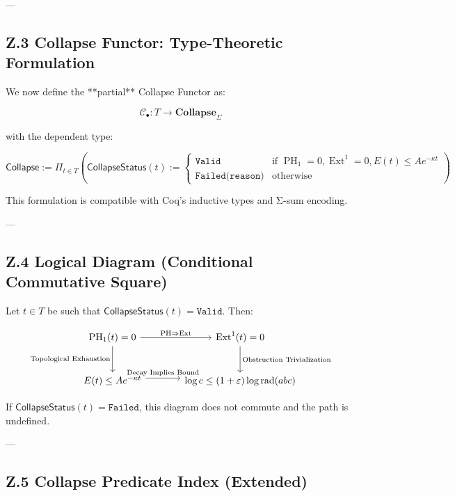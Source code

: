 \documentclass[11pt]{article}
\DeclareMathOperator{\Ext}{Ext}
\DeclareMathOperator{\PH}{PH}
\begin{document}
---

\subsection*{Z.3 Collapse Functor: Type-Theoretic Formulation}

We now define the **partial** Collapse Functor as:

\[
\mathcal{C}_\bullet : T \longrightarrow \mathbf{Collapse}_{\Sigma}
\]

with the dependent type:

\[
\mathsf{Collapse} := \Pi_{t \in T} \left(
  \mathsf{CollapseStatus}(t) := 
  \begin{cases}
    \texttt{Valid} & \text{if } \PH_1 = 0, \Ext^1 = 0, E(t) \leq Ae^{-\kappa t} \\
    \texttt{Failed(reason)} & \text{otherwise}
  \end{cases}
\right)
\]

This formulation is compatible with Coq's inductive types and Σ-sum encoding.

---

\subsection*{Z.4 Logical Diagram (Conditional Commutative Square)}

Let \( t \in T \) be such that \( \mathsf{CollapseStatus}(t) = \texttt{Valid} \). Then:

\[
\begin{tikzcd}[row sep=large, column sep=large]
\PH_1(t) = 0 \arrow[r, "\text{PH} \Rightarrow \Ext"] \arrow[d, swap, "\text{Topological Exhaustion}"]
& \Ext^1(t) = 0 \arrow[d, "\text{Obstruction Trivialization}"] \\
E(t) \leq Ae^{-\kappa t} \arrow[r, "\text{Decay Implies Bound}", yshift=0.7ex]
& \log c \leq (1+\varepsilon)\log \mathrm{rad}(abc)
\end{tikzcd}
\]


If \( \mathsf{CollapseStatus}(t) = \texttt{Failed} \), this diagram does not commute and the path is undefined.

---

\subsection*{Z.5 Collapse Predicate Index (Extended)}
\end{document}
